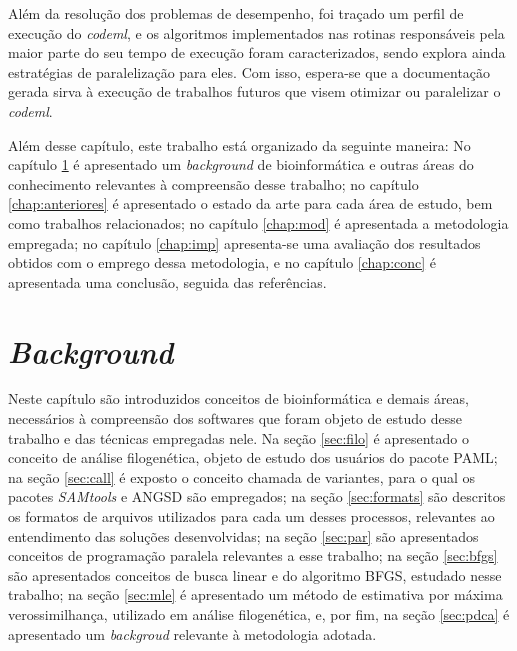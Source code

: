 \documentclass[cic,tc]{iiufrgs}
\begin{document}
Além da resolução dos problemas de desempenho, foi traçado um perfil de
execução do \textit{codeml}, e os algoritmos implementados nas rotinas
responsáveis pela maior parte do seu tempo de execução foram caracterizados,
sendo explora ainda estratégias de paralelização para eles. Com isso, espera-se
que a documentação gerada sirva à execução de trabalhos futuros que visem
otimizar ou paralelizar o \textit{codeml}.

%
%
Além desse capítulo, este trabalho está organizado da seguinte maneira: No
capítulo \ref{chap:bg} é apresentado um \textit{background} de bioinformática e
outras áreas do conhecimento relevantes à compreensão desse trabalho; no
capítulo \ref{chap:anteriores} é apresentado o estado da arte para cada área de
estudo, bem como trabalhos relacionados; no capítulo \ref{chap:mod} é
apresentada a metodologia empregada; no capítulo \ref{chap:imp} apresenta-se
uma avaliação dos resultados obtidos com o emprego dessa metodologia, e no
capítulo \ref{chap:conc} é apresentada uma conclusão, seguida das referências.

%
%
%
%

\chapter{\textit{Background}}
\label{chap:bg}

Neste capítulo são introduzidos conceitos de bioinformática e demais áreas,
necessários à compreensão dos softwares que foram objeto de estudo desse
trabalho e das técnicas empregadas nele. Na seção \ref{sec:filo} é apresentado o
conceito de análise filogenética, objeto de estudo dos usuários do pacote PAML;
na seção \ref{sec:call} é exposto o conceito chamada de variantes, para o qual
os pacotes \textit{SAMtools} e ANGSD são empregados; na seção \ref{sec:formats} são
descritos os formatos de arquivos utilizados para cada um desses processos,
relevantes ao entendimento das soluções desenvolvidas; na seção \ref{sec:par}
são apresentados conceitos de programação paralela relevantes
a esse trabalho; na seção \ref{sec:bfgs} são apresentados conceitos de busca
linear e do algoritmo BFGS, estudado nesse trabalho; na seção \ref{sec:mle} é
apresentado um método de estimativa por máxima verossimilhança, utilizado em
análise filogenética, e, por fim, na seção \ref{sec:pdca} é apresentado um
\textit{backgroud} relevante à metodologia adotada.

\end{document}
